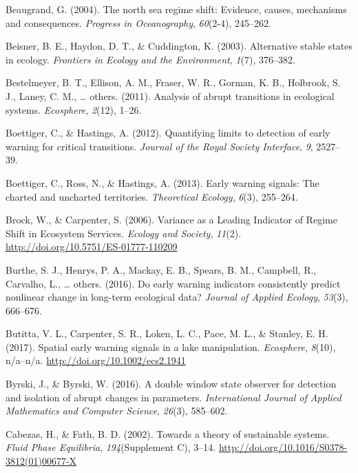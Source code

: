 \documentclass[12pt,twoside,openany]{reedthesis}
\begin{document}
\hypertarget{ref-beaugrand2004north}{}
Beaugrand, G. (2004). The north sea regime shift: Evidence, causes,
mechanisms and consequences. \emph{Progress in Oceanography},
\emph{60}(2-4), 245--262.

\hypertarget{ref-beisner2003alternative}{}
Beisner, B. E., Haydon, D. T., \& Cuddington, K. (2003). Alternative
stable states in ecology. \emph{Frontiers in Ecology and the
Environment}, \emph{1}(7), 376--382.

\hypertarget{ref-bestelmeyer_analysis_2011}{}
Bestelmeyer, B. T., Ellison, A. M., Fraser, W. R., Gorman, K. B.,
Holbrook, S. J., Laney, C. M., \ldots{} others. (2011). Analysis of
abrupt transitions in ecological systems. \emph{Ecosphere},
\emph{2}(12), 1--26.

\hypertarget{ref-boettiger_quantifying_2012}{}
Boettiger, C., \& Hastings, A. (2012). Quantifying limits to detection
of early warning for critical transitions. \emph{Journal of the Royal
Society Interface}, \emph{9}, 2527--39.

\hypertarget{ref-boettiger_early_2013}{}
Boettiger, C., Ross, N., \& Hastings, A. (2013). Early warning signals:
The charted and uncharted territories. \emph{Theoretical Ecology},
\emph{6}(3), 255--264.

\hypertarget{ref-brock_variance_2006}{}
Brock, W., \& Carpenter, S. (2006). Variance as a Leading Indicator of
Regime Shift in Ecosystem Services. \emph{Ecology and Society},
\emph{11}(2). \url{http://doi.org/10.5751/ES-01777-110209}

\hypertarget{ref-burthe2016early}{}
Burthe, S. J., Henrys, P. A., Mackay, E. B., Spears, B. M., Campbell,
R., Carvalho, L., \ldots{} others. (2016). Do early warning indicators
consistently predict nonlinear change in long-term ecological data?
\emph{Journal of Applied Ecology}, \emph{53}(3), 666--676.

\hypertarget{ref-butitta_spatial_2017}{}
Butitta, V. L., Carpenter, S. R., Loken, L. C., Pace, M. L., \& Stanley,
E. H. (2017). Spatial early warning signals in a lake manipulation.
\emph{Ecosphere}, \emph{8}(10), n/a--n/a.
\url{http://doi.org/10.1002/ecs2.1941}

\hypertarget{ref-byrski2016double}{}
Byrski, J., \& Byrski, W. (2016). A double window state observer for
detection and isolation of abrupt changes in parameters.
\emph{International Journal of Applied Mathematics and Computer
Science}, \emph{26}(3), 585--602.

\hypertarget{ref-cabezas_towards_2002}{}
Cabezas, H., \& Fath, B. D. (2002). Towards a theory of sustainable
systems. \emph{Fluid Phase Equilibria}, \emph{194}(Supplement C), 3--14.
\url{http://doi.org/10.1016/S0378-3812(01)00677-X}
\end{document}
